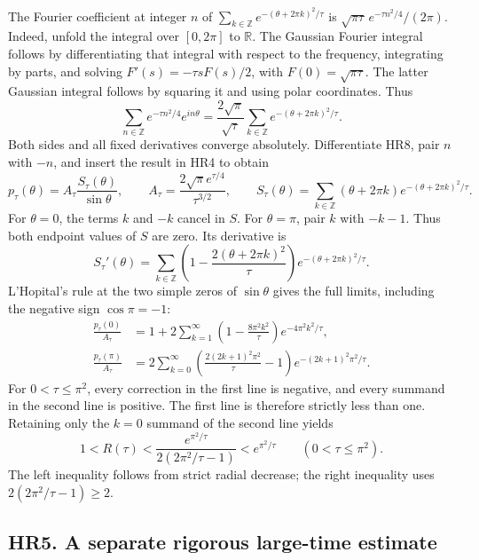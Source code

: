 \documentclass[11pt]{article}
\begin{document}
The Fourier coefficient at integer \(n\) of
\(\sum_{k\in\mathbb Z}e^{-(\theta+2\pi k)^2/\tau}\) is
\(\sqrt{\pi\tau}\,e^{-\tau n^2/4}/(2\pi)\). Indeed, unfold the
integral over \([0,2\pi]\) to \(\mathbb R\). The Gaussian Fourier
integral follows by differentiating that integral with respect to
the frequency, integrating by parts, and solving
\(F'(s)=-\tau sF(s)/2\), with \(F(0)=\sqrt{\pi\tau}\).
The latter Gaussian integral follows by squaring it and using
polar coordinates. Thus
\[
 \sum_{n\in\mathbb Z}e^{-\tau n^2/4}e^{in\theta}
 =\frac{2\sqrt\pi}{\sqrt\tau}
       \sum_{k\in\mathbb Z}e^{-(\theta+2\pi k)^2/\tau}.
                                                               \tag{HR8}
\]
Both sides and all fixed derivatives converge absolutely. Differentiate
HR8, pair \(n\) with \(-n\), and insert the result in HR4 to obtain
\[
 p_\tau(\theta)=A_\tau
  \frac{S_\tau(\theta)}{\sin\theta},\qquad
 A_\tau=\frac{2\sqrt\pi e^{\tau/4}}{\tau^{3/2}},\qquad
 S_\tau(\theta)=\sum_{k\in\mathbb Z}
      (\theta+2\pi k)e^{-(\theta+2\pi k)^2/\tau}.              \tag{HR9}
\]
For \(\theta=0\), the terms \(k\) and \(-k\) cancel in \(S\).
For \(\theta=\pi\), pair \(k\) with \(-k-1\). Thus both endpoint
values of \(S\) are zero. Its derivative is
\[
 S_\tau'(\theta)=\sum_{k\in\mathbb Z}
 \left(1-\frac{2(\theta+2\pi k)^2}{\tau}\right)
                       e^{-(\theta+2\pi k)^2/\tau}.
\]
L'Hopital's rule at the two simple zeros of \(\sin\theta\) gives
the full limits, including the negative sign \(\cos\pi=-1\):
\[
 \begin{aligned}
 \frac{p_\tau(0)}{A_\tau}
 &=1+2\sum_{k=1}^{\infty}
       \left(1-\frac{8\pi^2k^2}{\tau}\right)e^{-4\pi^2k^2/\tau},\\
 \frac{p_\tau(\pi)}{A_\tau}
 &=2\sum_{k=0}^{\infty}
       \left(\frac{2(2k+1)^2\pi^2}{\tau}-1\right)
                                   e^{-(2k+1)^2\pi^2/\tau}.
 \end{aligned}                                                  \tag{HR10}
\]
For \(0<\tau\le\pi^2\), every correction in the first line is
negative, and every summand in the second line is positive.
The first line is therefore strictly less than one. Retaining
only the \(k=0\) summand of the second line yields
\[
 1<R(\tau)<
  \frac{e^{\pi^2/\tau}}{2(2\pi^2/\tau-1)}
  <e^{\pi^2/\tau}\qquad(0<\tau\le\pi^2).                    \tag{HR11}
\]
The left inequality follows from strict radial decrease; the
right inequality uses \(2(2\pi^2/\tau-1)\ge2\).

\subsection*{HR5. A separate rigorous large-time estimate}
\end{document}
